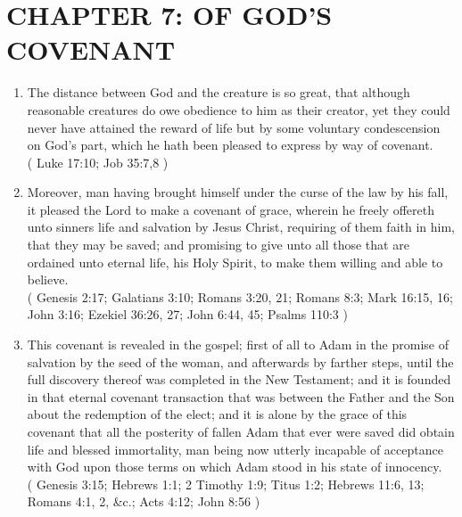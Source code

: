 \documentclass[12pt,a4paper]{book}
\begin{document}
\chapter{CHAPTER 7: OF GOD'S COVENANT}
\label{ch-god-cov}
\begin{enumerate}
\item The distance between God and the creature is so great, that although reasonable creatures do owe obedience to him as their creator, yet they could never have attained the reward of life but by some voluntary condescension on God's part, which he hath been pleased to express by way of covenant.\\
( Luke 17:10; Job 35:7,8 )
\item Moreover, man having brought himself under the curse of the law by his fall, it pleased the Lord to make a covenant of grace, wherein he freely offereth unto sinners life and salvation by Jesus Christ, requiring of them faith in him, that they may be saved; and promising to give unto all those that are ordained unto eternal life, his Holy Spirit, to make them willing and able to believe.\\
( Genesis 2:17; Galatians 3:10; Romans 3:20, 21; Romans 8:3; Mark 16:15, 16; John 3:16; Ezekiel 36:26, 27; John 6:44, 45; Psalms 110:3 )
\item This covenant is revealed in the gospel; first of all to Adam in the promise of salvation by the seed of the woman, and afterwards by farther steps, until the full discovery thereof was completed in the New Testament; and it is founded in that eternal covenant transaction that was between the Father and the Son about the redemption of the elect; and it is alone by the grace of this covenant that all the posterity of fallen Adam that ever were saved did obtain life and blessed immortality, man being now utterly incapable of acceptance with God upon those terms on which Adam stood in his state of innocency.\\
( Genesis 3:15; Hebrews 1:1; 2 Timothy 1:9; Titus 1:2; Hebrews 11:6, 13; Romans 4:1, 2, \&c.; Acts 4:12; John 8:56 )
\end{enumerate}
\end{document}
